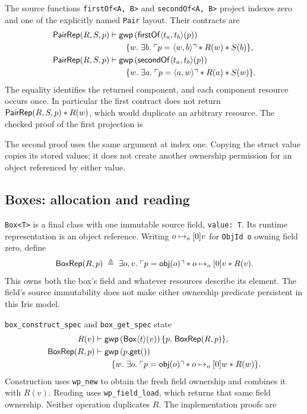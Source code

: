 The source functions \texttt{firstOf<A, B>} and \texttt{secondOf<A, B>}
project indexes zero and one of the explicitly named \texttt{Pair} layout.
Their contracts are
\[
\begin{aligned}
\mathsf{PairRep}(R,S,p)&\vdash
 \mathsf{gwp}\,(\mathsf{firstOf}\langle t_a,t_b\rangle(p))\\
 &\qquad\{w.\;\exists b.\;\ulcorner p=\langle w,b\rangle \urcorner\mathbin{*} R(w)\mathbin{*} S(b)\},\\
\mathsf{PairRep}(R,S,p)&\vdash
 \mathsf{gwp}\,(\mathsf{secondOf}\langle t_a,t_b\rangle(p))\\
 &\qquad\{w.\;\exists a.\;\ulcorner p=\langle a,w\rangle \urcorner\mathbin{*} R(a)\mathbin{*} S(w)\}.
\end{aligned}
\]
The equality identifies the returned component, and each component
resource occurs once. In particular the first contract does not return
\(\mathsf{PairRep}(R,S,p)\mathbin{*} R(w)\), which would duplicate an arbitrary
resource. The checked proof of the first projection is

The second proof uses the same argument at index one. Copying the struct
value copies its stored values; it does not create another ownership
permission for an object referenced by either value.

\subsection{Boxes: allocation and reading}

\texttt{Box<T>} is a final class with one immutable source field,
\texttt{value: T}. Its runtime representation is an object reference.
Writing \(o\mathrel{\mapsto_{o}}[0]v\) for \texttt{ObjId o} owning field zero, define
\[
\mathsf{BoxRep}(R,p)\;\triangleq\;
\exists o,v.\;\ulcorner p=\mathsf{obj}(o) \urcorner\mathbin{*} o\mathrel{\mapsto_{o}}[0]v\mathbin{*} R(v).
\]
This owns both the box's field and whatever resources describe its
element. The field's source immutability does not make either ownership
predicate persistent in this Iris model.

\texttt{box\_construct\_spec} and \texttt{box\_get\_spec} state
\[
\begin{aligned}
R(v)&\vdash
 \mathsf{gwp}\,(\mathsf{Box}\langle t\rangle(v))
   \,\{p.\;\mathsf{BoxRep}(R,p)\},\\
\mathsf{BoxRep}(R,p)&\vdash
 \mathsf{gwp}\,(p.\mathsf{get}())\\
 &\qquad\{w.\;\exists o.\;\ulcorner p=\mathsf{obj}(o) \urcorner
      \mathbin{*} o\mathrel{\mapsto_{o}}[0]w\mathbin{*} R(w)\}.
\end{aligned}
\]
Construction uses \texttt{wp\_new} to obtain the fresh field ownership and
combines it with \(R(v)\). Reading uses \texttt{wp\_field\_load}, which
returns that same field ownership. Neither operation duplicates \(R\).
The implementation proofs are


